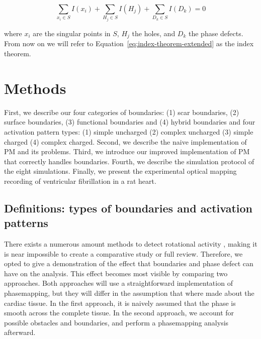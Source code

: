 \documentclass[twocolumn]{article}
\begin{document}
\begin{equation}
  \sum_{x_i \in S} I(x_i) + \sum_{H_j \in S} I(H_j) + \sum_{D_k \in S} I(D_k)  = 0
  \label{eq:index-theorem-extended}
\end{equation}

\noindent where \(x_i\) are the singular points in \(S\),
\(H_j\) the holes,
and \(D_k\) the phase defects.
From now on we will refer to Equation~\ref{eq:index-theorem-extended} as the index theorem.

\section{Methods}

First, we describe our four categories of boundaries: (1) scar boundaries, (2) surface boundaries, (3) functional boundaries and (4) hybrid boundaries and four activation pattern types: (1) simple uncharged (2) complex uncharged (3) simple charged (4) complex charged.
Second, we describe the naive implementation of PM and its problems. Third, we introduce our improved implementation of PM that correctly handles boundaries. Fourth, we describe the simulation protocol of the eight simulations. Finally, we present the experimental optical mapping recording of ventricular fibrillation in a rat heart.
\subsection{Definitions: types of boundaries and activation patterns}


There exists a numerous amount methods to detect rotational activity \autocite{pikunov2023the, gurevich2019robust, li2020standardizing},
making it is near impossible to create a comparative study or full review.
Therefore, we opted to give a demonstration of the effect
that boundaries and phase defect can have on the analysis.
This effect becomes most visible by comparing two approaches.
Both approaches will use a straightforward implementation of phasemapping, but
they will differ in the assumption that where made about the cardiac tissue.
In the first approach, it is naively assumed
that the phase is smooth across the complete tissue.
In the second approach, we account for possible obstacles and boundaries,
and perform a phasemapping analysis afterward.
\end{document}
